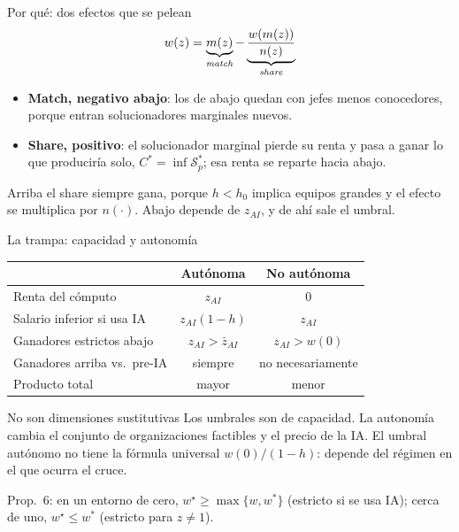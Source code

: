 \documentclass[11pt,aspectratio=169]{beamer}
\newcommand{\zai}{z_{AI}}
\newcommand{\Sset}{\mathcal S}
\begin{document}
\begin{frame}{Por qué: dos efectos que se pelean}
  \[
    w(z)=\underbrace{m(z)}_{\text{\emph{match}}}-\underbrace{\frac{w(m(z))}{n(z)}}_{\text{\emph{share}}}
  \]
  \begin{itemize}
    \item \textbf{Match, negativo abajo}: los de abajo quedan con jefes menos conocedores, porque
      entran solucionadores marginales nuevos.
    \item \textbf{Share, positivo}: el solucionador marginal pierde su renta y pasa a ganar lo que
      produciría solo, $C^{*}=\inf\Sset_p^{*}$; esa renta se reparte hacia abajo.
  \end{itemize}
  \vfill
  Arriba el share siempre gana, porque $h<h_0$ implica equipos grandes y el efecto se multiplica por
  $n(\cdot)$. Abajo depende de $\zai$, y de ahí sale el umbral.
\end{frame}

\begin{frame}{La trampa: capacidad y autonomía}
  \small
  \centering
  \begin{tabular}{@{}lcc@{}}
    \toprule
     & \textbf{Autónoma} & \textbf{No autónoma} \\ \midrule
    Renta del cómputo & $\zai$ & $0$ \\
    Salario inferior si usa IA & $\zai(1-h)$ & $\zai$ \\
    Ganadores estrictos abajo & $\zai>\bar z_{AI}$ & $\zai>w(0)$ \\
    Ganadores arriba vs.\ pre-IA & siempre & no necesariamente \\
    Producto total & mayor & menor \\ \bottomrule
  \end{tabular}
  \vfill
  \begin{alertblock}{No son dimensiones sustitutivas}
    Los umbrales son de capacidad. La autonomía cambia el conjunto de organizaciones
    factibles y el precio de la IA. El umbral autónomo no tiene la fórmula universal
    $w(0)/(1-h)$: depende del régimen en el que ocurra el cruce.
  \end{alertblock}
  \footnotesize Prop.\ 6: en un entorno de cero, $w^\star\ge\max\{w,w^*\}$ (estricto si se usa IA);
  cerca de uno, $w^\star\le w^*$ (estricto para $z\ne1$).
\end{frame}
\end{document}
